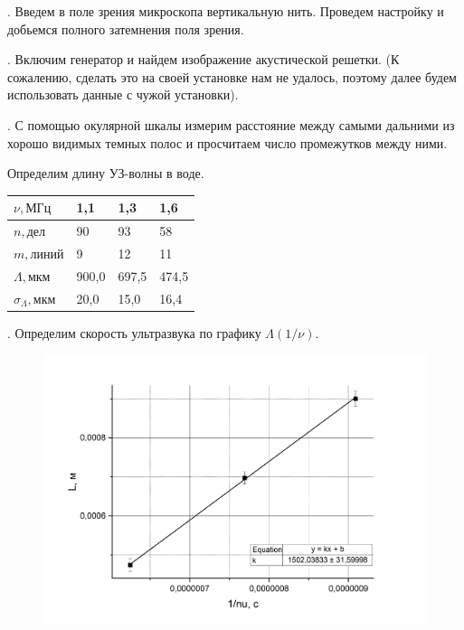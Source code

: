 \documentclass[a4paper,12pt]{article} %
\begin{document}
. Введем в поле зрения микроскопа вертикальную нить. Проведем настройку и добьемся полного затемнения поля зрения. 

\medskip

. Включим генератор и найдем изображение акустической решетки. (К сожалению, сделать это на своей установке нам не удалось, поэтому далее будем использовать данные с чужой установки).

\medskip

. С помощью окулярной шкалы измерим расстояние между самыми дальними из хорошо видимых темных полос и просчитаем число промежутков между ними.

\medskip

\noindent Определим длину УЗ-волны в воде.

\begin{table}[!h]
\begin{tabular}{|l|l|l|l|}
\hline
$\nu, \text{МГц}$      & 1,1   & 1,3   & 1,6   \\ \hline
$n, \text{дел}$        & 90    & 93    & 58    \\ \hline
$m, \text{линий}$      & 9     & 12    & 11    \\ \hline
$\Lambda, \text{мкм}$        & 900,0 & 697,5 & 474,5 \\ \hline
$\sigma_\Lambda, \text{мкм}$ & 20,0  & 15,0  & 16,4  \\ \hline
\end{tabular}
\end{table}

. Определим скорость ультразвука по графику $\Lambda(1/\nu)$.

\newpage

\begin{figure}[!h]
 	\centering 	\includegraphics[width=0.8\linewidth]{темное_поле.png}
 \end{figure}
 
\end{document}
